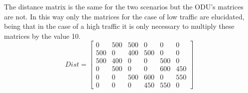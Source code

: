 \vspace{11pt}
The distance matrix is the same for the two scenarios but the ODU's matrices are not.
In this way only the matrices for the case of low traffic are elucidated, being that in the case of a high traffic it is only necessary to multiply these matrices by the value 10.\\

\[
Dist=
  \begin{bmatrix}
    0 & 500 & 500 & 0 & 0 & 0 \\
    500 & 0 & 400 & 500 & 0 & 0 \\
    500 & 400 & 0 & 0 & 500 & 0 \\
    0 & 500 & 0 & 0 & 600 & 450 \\
    0 & 0 & 500 & 600 & 0 & 550 \\
    0 & 0 & 0 & 450 & 550 & 0
  \end{bmatrix}
\]

